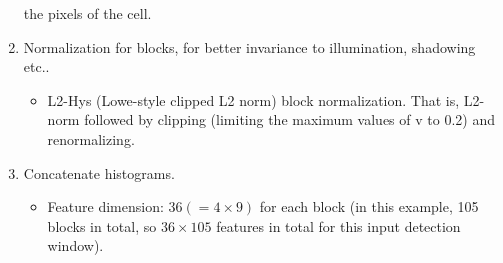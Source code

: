 \documentclass[12pt]{article}
\numberwithin{equation}{section}
\begin{document}
\begin{enumerate}
	the pixels of the cell.
	\item Normalization for blocks, for better invariance to illumination, shadowing etc..
		\begin{itemize}
			\item L2-Hys (Lowe-style clipped L2 norm) block normalization. That is, L2-norm followed by 
			clipping (limiting the maximum values of v to 0.2) and renormalizing.
		\end{itemize}		
	\item Concatenate histograms.
		\begin{itemize}
			\item Feature dimension: $36(=4 \times 9)$ for each block (in this example, 105 blocks in total,
			so $36 \times 105$ features in total for this input detection window).
		\end{itemize}	
\end{enumerate}
\end{document}
